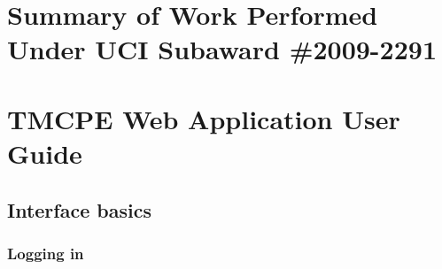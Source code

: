 \documentclass[12pt]{report}
\newif\ifuserguide %
\begin{document}






\appendix


\chapter{Summary of Work Performed Under UCI Subaward \#2009-2291}
\label{chap:actlog-sub}

\clearpage



\clearpage


\ifuserguide%

\chapter{TMCPE Web Application User Guide}
\label{chap:user-guide}


\section{Interface basics}
\label{sec:ui-basics}

\subsection{Logging in}
\label{sec:ui-login}
\end{document}
